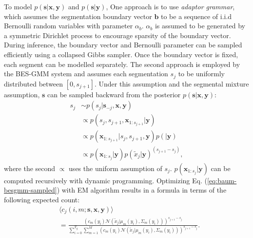 \documentclass[journal]{IEEEtran}
\begin{document}
To model $p(\mathbf s|\mathbf x, \mathbf y)$ and $p(\mathbf s|\mathbf y)$, One approach 
 is to use \textit{adaptor grammar}\cite{Johnson2007, Lee2012}, which assumes the segmentation boundary vector $\mathbf{b}$ to be a sequence of i.i.d Bernoulli random variables with parameter $\alpha_b$. $\alpha_b$ is assumed to be generated by a symmetric Dirichlet process to encourage sparsity of the boundary vector. During inference, the boundary vector and Bernoulli parameter can be sampled efficiently using a collapsed Gibbs sampler. Once the boundary vector is fixed, each segment can be modelled separately. The second approach is employed by the BES-GMM system \cite{Kamper2017} and assumes each segmentation $s_j$ to be uniformly distributed between $[0, s_{j+1}]$. Under this assumption and the segmental mixture assumption, $\mathbf s$ can be sampled backward from the posterior $p(\mathbf s|\mathbf x, \mathbf y)$:
 \begin{align*}
     s_j &\sim p(s_j|\mathbf s_{-j}, \mathbf x, \mathbf y)\\
     &\propto p(s_j, s_{j+1}, \mathbf x_{1:s_{j+1}}|\mathbf y)\\
     &\propto p(\mathbf x_{1:s_{j+1}}|s_j, s_{j+1}, \mathbf y) p(|\mathbf y)\\
     &\propto p(\mathbf x_{1:s_{j}}|\mathbf y) p(\tilde{x}_j|\mathbf y)^{(s_{j+1}-s_j)},
 \end{align*}
 where the second $\propto$ uses the uniform assumption of $s_j$. $p(\mathbf x_{1:s_{j}}|\mathbf y)$ can be computed recursively with dynamic programming. Optimizing Eq. (\ref{eq:baum-besgmm-sampled}) with EM algorithm results in a formula in terms of the following expected count:
 \begin{align}\label{eq:expected_counts_besgmm}
     &\langle c_j(i, m;\mathbf s, \mathbf x, \mathbf y)\rangle\\
     &= \frac{(c_{m}(y_{i})\mathcal N(\tilde{x}_j|\mu_{m}(y_{i}), \Sigma_{m}(y_{i})))^{s_{j+1}-s_j}}{\sum_{i=0}^{T_y}\sum_{m=1}^M (c_{m}(y_{i})\mathcal N(\tilde{x}_j|\mu_{m}(y_{i}), \Sigma_{m}(y_{i})))^{s_{j+1}-s_j}}.
 \end{align}
 
\end{document}
